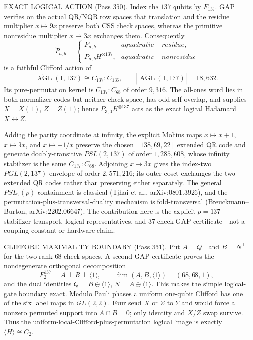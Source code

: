 \documentclass[12pt,a4paper]{article}
\def\mathbf#1{#1}%
\def\textbf#1{#1}%
\def\text#1{#1}%
\theoremstyle{definition}
\begin{document}
\begin{center}
{{\smallskip
\textbf{EXACT LOGICAL ACTION (Pass 360).}  Index the $137$ qubits by
$\mathbf F_{137}$.  GAP verifies on the actual QR/NQR row spaces that translation
and the residue multiplier $x\mapsto9x$ preserve both CSS check spaces, whereas
the primitive nonresidue multiplier $x\mapsto3x$ exchanges them.  Consequently
\[
 \widetilde P_{a,b}=\begin{cases}
 P_{a,b},&a\text{ quadratic-residue},\\
 P_{a,b}H^{\otimes137},&a\text{ quadratic-nonresidue}
 \end{cases}
\]
is a faithful Clifford action of
\[
 \widetilde{\operatorname{AGL}}(1,137)\cong C_{137}:C_{136},
 \qquad |\widetilde{\operatorname{AGL}}(1,137)|=18{,}632.
\]
Its pure-permutation kernel is $C_{137}:C_{68}$ of order $9{,}316$.  The
all-ones word lies in both normalizer codes but neither check space, has odd
self-overlap, and supplies $\bar X=X(\mathbf1)$, $\bar Z=Z(\mathbf1)$; hence
$P_{3,0}H^{\otimes137}$ acts as the exact logical Hadamard
$\bar X\leftrightarrow\bar Z$.

Adding the parity coordinate at infinity, the explicit Mobius maps
$x\mapsto x+1$, $x\mapsto9x$, and $x\mapsto-1/x$ preserve the chosen
$[138,69,22]$ extended QR code and generate doubly-transitive
$PSL(2,137)$ of order $1{,}285{,}608$, whose infinity stabilizer is the same
$C_{137}:C_{68}$.  Adjoining $x\mapsto3x$ gives the index-two
$PGL(2,137)$ envelope of order $2{,}571{,}216$; its outer coset exchanges the
two extended QR codes rather than preserving either separately.  The general
$PSL_2(p)$ containment is classical (Tjhai et al., arXiv:0801.3926), and the
permutation-plus-transversal-duality mechanism is fold-transversal
(Breuckmann--Burton, arXiv:2202.06647).  The contribution here is the explicit
$p=137$ stabilizer transport, logical representatives, and 37-check GAP
certificate---not a coupling-constant or hardware claim.

\smallskip
\textbf{CLIFFORD MAXIMALITY BOUNDARY (Pass 361).}  Put
$A=Q^\perp$ and $B=N^\perp$ for the two rank-$68$ check spaces.  A second GAP
certificate proves the nondegenerate orthogonal decomposition
\[
 \mathbf F_2^{137}=A\perp B\perp\langle\mathbf1\rangle,
 \qquad \dim(A,B,\langle\mathbf1\rangle)=(68,68,1),
\]
and the dual identities
$Q=B\oplus\langle\mathbf1\rangle$,
$N=A\oplus\langle\mathbf1\rangle$.  This makes the simple logical-gate
boundary exact.  Modulo Pauli phases a uniform one-qubit Clifford has one of
the six label maps in $GL(2,2)$.  Four send $X$ or $Z$ to $Y$ and would force a
nonzero permuted support into $A\cap B=0$; only identity and $X/Z$ swap survive.
Thus the uniform-local-Clifford-plus-permutation logical image is exactly
$\langle\bar H\rangle\cong C_2$.

}}
\end{center}
\end{document}
